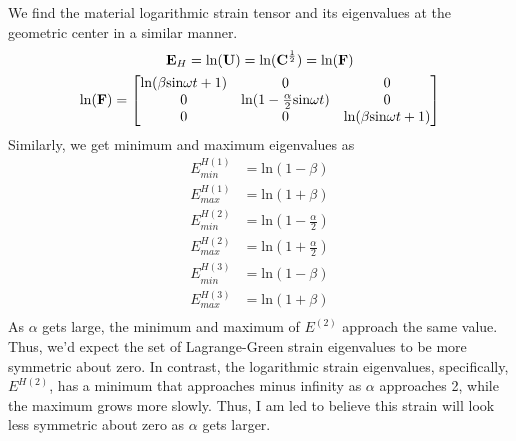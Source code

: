 We find the material logarithmic strain tensor and its eigenvalues at the geometric center in a similar manner.
\begin{gather*}
    \mathbf{E}_H=\text{ln}(\mathbf{U})=\text{ln}(\mathbf{C}^{\frac{1}{2}})=\text{ln}(\mathbf{F})\\
    \text{ln}(\mathbf{F})=\begin{bmatrix}
        \text{ln}(\beta\text{sin}\omega t+1)& 0& 0\\ 0& \text{ln}(1-\frac{\alpha}{2}\text{sin}\omega t)&0 \\0 & 0&\text{ln}(\beta\text{sin}\omega t+1)
    \end{bmatrix}
\end{gather*}
Similarly, we get minimum and maximum eigenvalues as
\begin{align*}
    E_{min}^{H(1)}&=\text{ln}(1-\beta)\\
    E_{max}^{H(1)}&=\text{ln}(1+\beta)\\
    E_{min}^{H(2)}&=\text{ln}(1-\frac{\alpha}{2})\\ 
    E_{max}^{H(2)}&=\text{ln}(1+\frac{\alpha}{2})\\
    E_{min}^{H(3)}&=\text{ln}(1-\beta)\\
    E_{max}^{H(3)}&=\text{ln}(1+\beta)\\
\end{align*}
As $\alpha$ gets large, the minimum and maximum of $E^{(2)}$ approach the same value. Thus, we'd expect the set of Lagrange-Green strain eigenvalues to be more symmetric about zero. In contrast, the logarithmic strain eigenvalues, specifically, $E^{H(2)}$, has a minimum that approaches minus infinity as $\alpha$ approaches 2, while the maximum grows more slowly. Thus, I am led to believe this strain will look less symmetric about zero as $\alpha$ gets larger.

